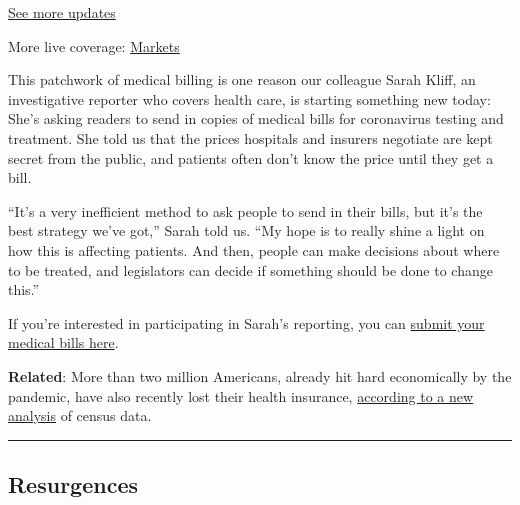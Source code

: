 \href{https://www.nytimes3xbfgragh.onion/2020/08/04/world/coronavirus-cases.html?action=click\&pgtype=Article\&state=default\&region=MAIN_CONTENT_1\&context=storylines_live_updates}{See
more updates}

More live coverage:
\href{https://www.nytimes3xbfgragh.onion/live/2020/08/04/business/stock-market-today-coronavirus?action=click\&pgtype=Article\&state=default\&region=MAIN_CONTENT_1\&context=storylines_live_updates}{Markets}

This patchwork of medical billing is one reason our colleague Sarah
Kliff, an investigative reporter who covers health care, is starting
something new today: She's asking readers to send in copies of medical
bills for coronavirus testing and treatment. She told us that the prices
hospitals and insurers negotiate are kept secret from the public, and
patients often don't know the price until they get a bill.

``It's a very inefficient method to ask people to send in their bills,
but it's the best strategy we've got,'' Sarah told us. ``My hope is to
really shine a light on how this is affecting patients. And then, people
can make decisions about where to be treated, and legislators can decide
if something should be done to change this.''

If you're interested in participating in Sarah's reporting, you can
\href{https://www.nytimes3xbfgragh.onion/2020/08/03/reader-center/coronavirus-medical-bills.html}{submit
your medical bills here}.

\textbf{Related}: More than two million Americans, already hit hard
economically by the pandemic, have also recently lost their health
insurance,
\href{https://www.nytimes3xbfgragh.onion/2020/08/03/world/coronavirus-covid-19.html\#link-2dcb9c03}{according
to a new analysis} of census data.

\begin{center}\rule{0.5\linewidth}{\linethickness}\end{center}

\hypertarget{resurgences}{%
\subsection{Resurgences}\label{resurgences}}

